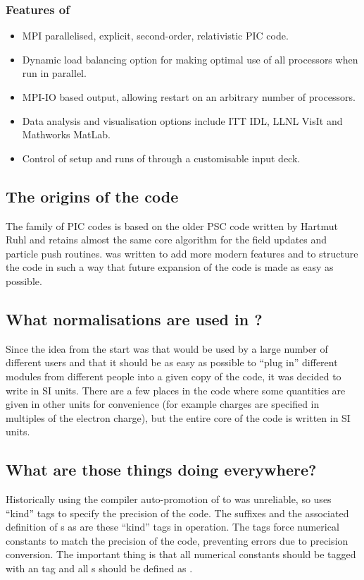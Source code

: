 \subsubsection{Features of {\EPOCH}}
\begin{itemize}
  \item MPI parallelised, explicit, second-order, relativistic PIC code.
  \item Dynamic load balancing option for making optimal use of all processors
    when run in parallel.
  \item MPI-IO based output, allowing restart on an arbitrary number of
    processors.
  \item Data analysis and visualisation options include ITT IDL, LLNL VisIt
    and Mathworks MatLab.
  \item Control of setup and runs of {\EPOCH} through a customisable input deck.
\end{itemize}

\subsection{The origins of the code}
The {\EPOCH} family of PIC codes is based on the older PSC code written by
Hartmut Ruhl and retains almost the same core algorithm for the field updates
and particle push routines. {\EPOCH} was written to add more modern features
and to structure the code in such a way that future expansion of the code is
made as easy as possible.

\subsection{What normalisations are used in {\EPOCH}?}
Since the idea from the start was that {\EPOCH} would be used by a large number
of different users and that it should be as easy as possible to ``plug in''
different modules from different people into a given copy of the code, it was
decided to write {\EPOCH} in SI units. There are a few places in the code where
some quantities are given in other units for convenience (for example charges
are specified in multiples of the electron charge), but the entire core of the
code is written in SI units.

\subsection{What are those  things doing everywhere?}
Historically using the compiler auto-promotion of  to
 was unreliable, so {\EPOCH} uses ``kind'' tags to
specify the precision of the code. The  suffixes and the associated
definition of s as  are these ``kind'' tags in
operation. The  tags force numerical constants to match the
precision of the code, preventing errors due to precision conversion. The
important thing is that all numerical constants should be tagged with an
 tag and all s should be defined as .

